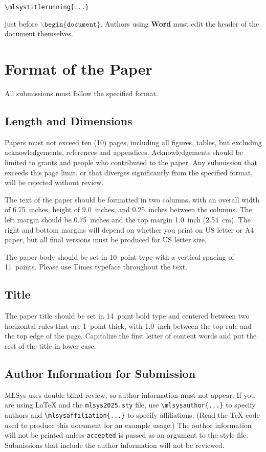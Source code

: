 \documentclass{article}
\begin{document}
\verb|\mlsystitlerunning{...}|

just before $\mathtt{\backslash begin\{document\}}$.
Authors using \textbf{Word} must edit the header of the document themselves.

\section{Format of the Paper}

All submissions must follow the specified format.

\subsection{Length and Dimensions}

Papers must not exceed ten (10) pages, including all figures, tables,
but excluding acknowledgements, references and appendices.
Acknowledgements should be limited to grants and people who contributed to the paper.
Any submission that exceeds
this page limit, or that diverges significantly from the specified format,
will be rejected without review.

The text of the paper should be formatted in two columns, with an
overall width of 6.75~inches, height of 9.0~inches, and 0.25~inches
between the columns. The left margin should be 0.75~inches and the top
margin 1.0~inch (2.54~cm). The right and bottom margins will depend on
whether you print on US letter or A4 paper, but all final versions
must be produced for US letter size.

The paper body should be set in 10~point type with a vertical spacing
of 11~points. Please use Times typeface throughout the text.

\subsection{Title}

The paper title should be set in 14~point bold type and centered
between two horizontal rules that are 1~point thick, with 1.0~inch
between the top rule and the top edge of the page. Capitalize the
first letter of content words and put the rest of the title in lower
case.

\subsection{Author Information for Submission}
\label{author info}

MLSys uses double-blind review, so author information must not appear. If
you are using \LaTeX\/ and the \texttt{mlsys2025.sty} file, use
\verb+\mlsysauthor{...}+ to specify authors and \verb+\mlsysaffiliation{...}+ to specify affiliations. (Read the TeX code used to produce this document for an example usage.) The author information
will not be printed unless \texttt{accepted} is passed as an argument to the
style file.
Submissions that include the author information will not
be reviewed.
\end{document}
